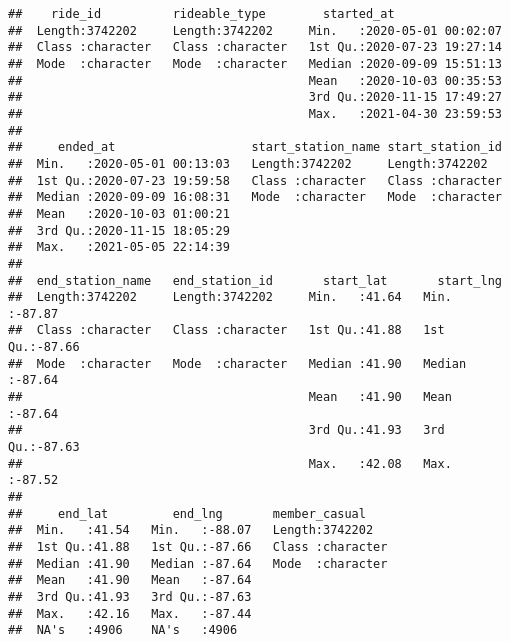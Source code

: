 \documentclass[
]{article}
\begin{document}
\begin{verbatim}
##    ride_id          rideable_type        started_at                 
##  Length:3742202     Length:3742202     Min.   :2020-05-01 00:02:07  
##  Class :character   Class :character   1st Qu.:2020-07-23 19:27:14  
##  Mode  :character   Mode  :character   Median :2020-09-09 15:51:13  
##                                        Mean   :2020-10-03 00:35:53  
##                                        3rd Qu.:2020-11-15 17:49:27  
##                                        Max.   :2021-04-30 23:59:53  
##                                                                     
##     ended_at                   start_station_name start_station_id  
##  Min.   :2020-05-01 00:13:03   Length:3742202     Length:3742202    
##  1st Qu.:2020-07-23 19:59:58   Class :character   Class :character  
##  Median :2020-09-09 16:08:31   Mode  :character   Mode  :character  
##  Mean   :2020-10-03 01:00:21                                        
##  3rd Qu.:2020-11-15 18:05:29                                        
##  Max.   :2021-05-05 22:14:39                                        
##                                                                     
##  end_station_name   end_station_id       start_lat       start_lng     
##  Length:3742202     Length:3742202     Min.   :41.64   Min.   :-87.87  
##  Class :character   Class :character   1st Qu.:41.88   1st Qu.:-87.66  
##  Mode  :character   Mode  :character   Median :41.90   Median :-87.64  
##                                        Mean   :41.90   Mean   :-87.64  
##                                        3rd Qu.:41.93   3rd Qu.:-87.63  
##                                        Max.   :42.08   Max.   :-87.52  
##                                                                        
##     end_lat         end_lng       member_casual     
##  Min.   :41.54   Min.   :-88.07   Length:3742202    
##  1st Qu.:41.88   1st Qu.:-87.66   Class :character  
##  Median :41.90   Median :-87.64   Mode  :character  
##  Mean   :41.90   Mean   :-87.64                     
##  3rd Qu.:41.93   3rd Qu.:-87.63                     
##  Max.   :42.16   Max.   :-87.44                     
##  NA's   :4906    NA's   :4906
\end{verbatim}
\end{document}
